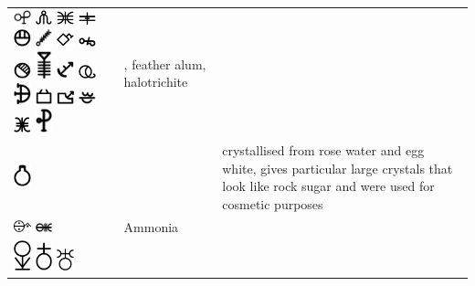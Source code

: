 \documentclass[british,final,landscape]{scrartcl}
\begin{document}
\begin{refsection}
\begin{supertabular}{p{0.3\textwidth}p{0.34\textwidth}p{0.34\textwidth}}
   \includegraphics[width=5mm]{Compounds/AlumenPlumeum} \includegraphics[width=5mm]{Compounds/AlumenPlumeum2} \includegraphics[width=5mm]{Compounds/AlumenPlumeum3} \includegraphics[width=5mm]{Compounds/AlumenPlumeum4} \includegraphics[width=5mm]{Compounds/AlumenPlumeum5} \includegraphics[width=5mm]{Compounds/AlumenPlumeum6} \includegraphics[width=5mm]{Compounds/AlumenPlumeum7} \includegraphics[width=5mm]{Compounds/AlumenPlumeum8} \includegraphics[width=5mm]{Compounds/AlumenPlumeum9} \includegraphics[width=5mm]{Compounds/AlumenPlumeum10} \includegraphics[width=5mm]{Compounds/AlumenPlumeum11} \includegraphics[width=5mm]{Compounds/AlumenPlumeum12} \includegraphics[width=5mm]{Compounds/AlumenPlumeum13} \includegraphics[width=5mm]{Compounds/AlumenPlumeum14} \includegraphics[width=5mm]{Compounds/AlumenPlumeum15} \includegraphics[width=5mm]{Compounds/AlumenPlumeum16} \includegraphics[width=5mm]{Compounds/AlumenPlumeum17} \includegraphics[width=5mm]{Compounds/AlumenPlumeum18} & , feather alum, halotrichite  &  \\
   \includegraphics[width=5mm]{Compounds/ALumenSaccharinum} &   &  crystallised from rose water and egg white, gives particular large crystals that look like rock sugar and were used for cosmetic purposes \\
   \includegraphics[width=5mm]{Compounds/Ammonia} \includegraphics[width=5mm]{Compounds/Ammonia2} & Ammonia  & \\
  \includegraphics[width=5mm]{Compounds/Antimony1} \includegraphics[width=5mm]{Compounds/Antimony2} \includegraphics[width=5mm]{Compounds/Antimony3} 
\end{supertabular}
\end{refsection}
\end{document}
